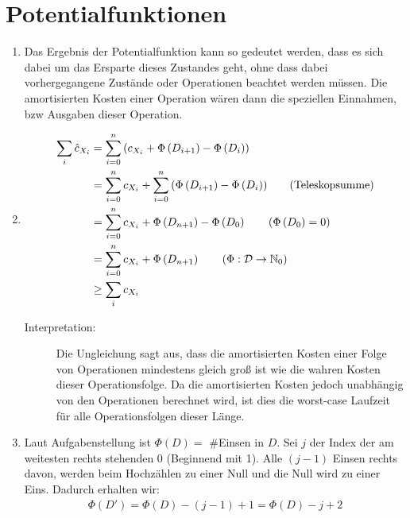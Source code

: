 \documentclass[a4paper,10pt]{article}
\begin{document}
\section{Potentialfunktionen}
\begin{enumerate}
\item   Das Ergebnis der Potentialfunktion kann so gedeutet werden, dass es sich dabei um das Ersparte dieses Zustandes geht, ohne dass dabei vorhergegangene Zustände oder Operationen beachtet werden müssen. Die amortisierten Kosten einer Operation wären dann die speziellen Einnahmen, bzw Ausgaben dieser Operation.
\item   \begin{align*}
	\sum_i{\hat c_{X_i}} &= \sum\limits_{i = 0}^{n}{\left(c_{X_i} + \Phi \left( D_{i+1} \right) - \Phi \left( D_i \right) \right) } \\
	&= \sum\limits_{i=0}^{n}{c_{X_i}} + \sum\limits_{i=0}^{n}{\left( \Phi \left( D_{i+1} \right) - \Phi \left( D_i \right) \right) } \tag{Teleskopsumme}\\
	&= \sum\limits_{i=0}^{n}{c_{X_i}} + \Phi \left( D_{n+1} \right) - \Phi \left( D_0 \right) \tag{$\Phi \left( D_0 \right) = 0$}\\
	&= \sum\limits_{i=0}^{n}{c_{X_i}} + \Phi \left( D_{n+1} \right) \tag{$\Phi : \mathcal{D} \rightarrow \mathbb{N}_0 $}\\
	&\geq \sum_i{c_{X_i}}
	\end{align*}
	\begin{description}
	\item[Interpretation:] Die Ungleichung sagt aus, dass die amortisierten Kosten einer Folge von Operationen mindestens gleich groß ist wie die wahren Kosten dieser Operationsfolge. Da die amortisierten Kosten jedoch unabhängig von den Operationen berechnet wird, ist dies die worst-case Laufzeit für alle Operationsfolgen dieser Länge.
	\end{description}
\item   Laut Aufgabenstellung ist $\Phi \left( D\right) =$ \#Einsen in $D$. 
Sei $j$ der Index der am weitesten rechts stehenden $0$ (Beginnend mit 1). Alle $(j-1)$ Einsen rechts davon, werden beim Hochzählen zu einer Null und die Null wird zu einer Eins. Dadurch erhalten wir:\begin{align*}
	\Phi\left( D' \right) = \Phi\left( D \right) - (j - 1) + 1 = \Phi\left( D \right) - j + 2

\end{align*}
\end{enumerate}
\end{document}
